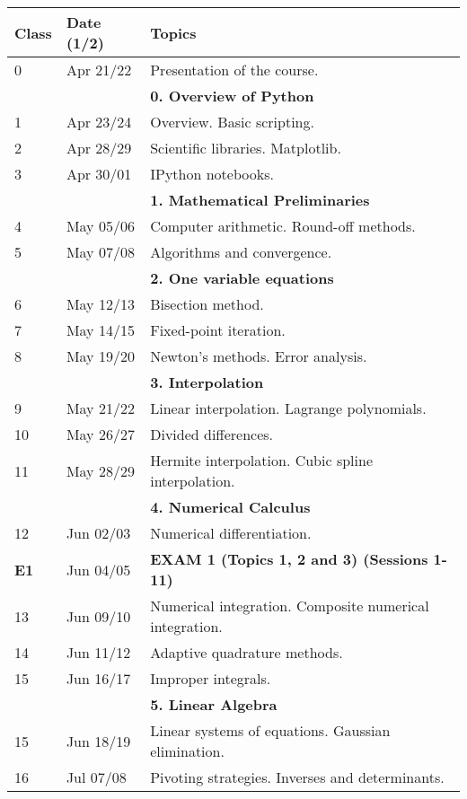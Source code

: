 \documentclass[a4,useAMS,usenatbib,usegraphicx,12pt]{article}
\begin{document}
\begin{table}[!ht]
\begin{small}
\begin{flushleft}
\begin{center}
  \begin{tabular}{l  l  l} \hline\hline
	\centering\textbf{Class} & \textbf{Date (1/2)} & \textbf{Topics} \\ \hline
	0 & Apr 21/22& Presentation of the course. \\
	& & \textbf{0. Overview of Python} \\
	1 & Apr 23/24& Overview. Basic scripting. \\
	2 & Apr 28/29& Scientific libraries. Matplotlib. \\
	3 & Apr 30/01& IPython notebooks. \\
	& & \textbf{1. Mathematical Preliminaries} \\
	4 & May 05/06& Computer arithmetic. Round-off methods. \\
	5 & May 07/08& Algorithms and convergence. \\
	& & \textbf{2. One variable equations} \\
	6 & May 12/13& Bisection method. \\
	7 & May 14/15& Fixed-point iteration. \\
	8 & May 19/20& Newton's methods. Error analysis. \\
	& & \textbf{3. Interpolation} \\
	9 & May 21/22& Linear interpolation. Lagrange polynomials. \\
	10 & May 26/27& Divided differences. \\
	11 & May 28/29& Hermite interpolation. Cubic spline interpolation. \\
	& & \textbf{4. Numerical Calculus} \\
	12 & Jun 02/03& Numerical differentiation. \\
	\textbf{E1} & Jun 04/05& \textbf{EXAM 1 (Topics 1, 2 and 3) (Sessions 1-11)} \\
	13 & Jun 09/10& Numerical integration. Composite numerical integration. \\
	14 & Jun 11/12& Adaptive quadrature methods. \\
	15 & Jun 16/17& Improper integrals. \\
	& & \textbf{5. Linear Algebra} \\
	15 & Jun 18/19& Linear systems of equations. Gaussian elimination. \\
	16 & Jul 07/08& Pivoting strategies. Inverses and determinants. \\

\end{tabular}
\end{center}
\end{flushleft}
\end{small}
\end{table}
\end{document}

